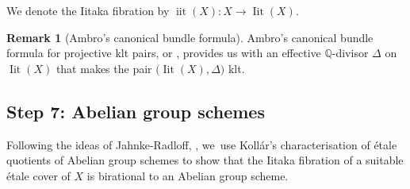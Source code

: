 \documentclass[JEP,XML,SOM,Unicode,published]{cedram}
\theoremstyle{plain}
\theoremstyle{definition}
\newtheorem{rem}[thm]{Remark}
\numberwithin{equation}{thm}
\numberwithin{enumi}{thm}
\DeclareMathOperator{\iit}{iit}
\DeclareMathOperator{\Iit}{Iit}
\newcommand{\bQ}{\mathbb{Q}}
\begin{document}
We denote the Iitaka fibration by $\iit(X) : X \to \Iit(X)$.

\begin{rem}[Ambro’s canonical bundle formula]\label{rem:ACBF}
Ambro’s canonical bundle formula for projective klt pairs,
\cite[Th.\,4.1]{MR2134273} or \cite[Th.\,3.1]{MR2944479}, provides us with an
effective $\bQ$-divisor $\Delta$ on $\Iit(X)$ that makes the pair
$\bigl(\Iit(X), \Delta \bigr)$ klt.
\end{rem}

\subsection*{Step 7: Abelian group schemes}

Following the ideas of Jahnke-Radloff, \cite{MR3030068}, we~use Kollár's
characterisation of étale quotients of Abelian group schemes to show that the
Iitaka fibration of a suitable étale cover of $X$ is birational to an Abelian
group scheme.
\end{document}
